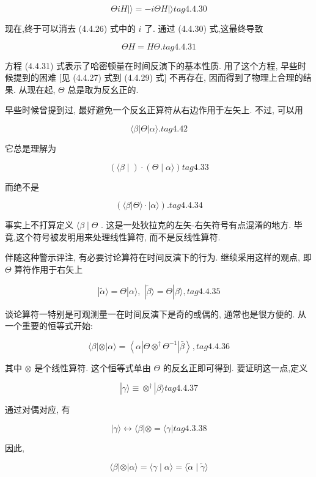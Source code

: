 $$
{\Theta iH}\left| {\rangle = - {i\Theta H}}\right| \rangle tag{4. 4.30}
$$

现在,终于可以消去 (4.4.26) 式中的 $i$ 了. 通过 (4.4.30) 式,这最终导致

$$
{\Theta H} = {H\Theta }. tag{4. 4.31}
$$

方程 (4.4.31) 式表示了哈密顿量在时间反演下的基本性质. 用了这个方程, 早些时候提到的困难 [见 (4.4.27) 式到 (4.4.29) 式] 不再存在, 因而得到了物理上合理的结果. 从现在起, $\Theta$ 总是取为反幺正的.

早些时候曾提到过, 最好避免一个反幺正算符从右边作用于左矢上. 不过, 可以用

$$
\langle \beta \left| \Theta \right| \alpha \rangle \text{.} tag{4. 42}
$$

它总是理解为

$$
\left( {\langle \beta \mid }\right) \cdot \left( {\Theta \mid \alpha \rangle }\right) tag{4. 3 3}
$$

而绝不是

$$
\left( {\langle \beta \left| {\Theta \rangle \cdot }\right| \alpha \rangle }\right) \text{.} tag{4. 4.34}
$$

事实上不打算定义 $\langle \beta \mid \Theta$ . 这是一处狄拉克的左矢-右矢符号有点混淆的地方. 毕竟,这个符号被发明用来处理线性算符, 而不是反线性算符.

伴随这种警示评注, 有必要讨论算符在时间反演下的行为. 继续采用这样的观点, 即 $\Theta$ 算符作用于右矢上

$$
\left| {\widetilde{\alpha }\rangle = \Theta }\right| \alpha \rangle ,\;\left| {\widetilde{\beta }\rangle = \Theta }\right| \beta \rangle , tag{4. 4.35}
$$

谈论算符一特别是可观测量一在时间反演下是奇的或偶的, 通常也是很方便的. 从一个重要的恒等式开始:

$$
\langle \beta \left| \otimes \right| \alpha \rangle = \left\langle {\alpha \left| {\Theta { \otimes }^{ \dagger }{\Theta }^{-1}}\right| \bar{\beta }}\right\rangle , tag{4. 4.36}
$$

其中 $\otimes$ 是个线性算符. 这个恒等式单由 $\Theta$ 的反幺正即可得到. 要证明这一点,定义

$$
\left| {\gamma \rangle \equiv { \otimes }^{ \dagger }}\right| \beta \rangle tag{4. 4.37}
$$

通过对偶对应, 有

$$
\left| {\gamma \rangle \leftrightarrow \langle \beta }\right| \otimes = \langle \gamma | tag{4. 3.38}
$$

因此,

$$
\langle \beta \left| \otimes \right| \alpha \rangle = \langle \gamma \mid \alpha \rangle = \langle \widetilde{\alpha } \mid \widetilde{\gamma }\rangle
$$

